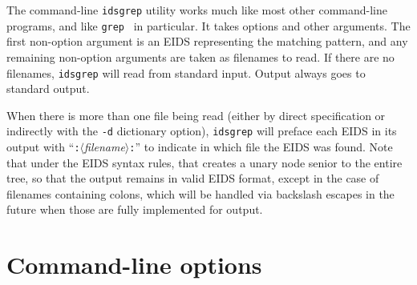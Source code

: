\documentclass[twocolumn]{report}
\begin{document}
The command-line \texttt{idsgrep} utility works much like most other
command-line programs, and like \texttt{grep}~\cite{grep} in particular.  It
takes options and other arguments.  The first non-option argument is an EIDS
representing the matching pattern, and any remaining non-option arguments
are taken as filenames to read.  If there are no filenames, \texttt{idsgrep}
will read from standard input.  Output always goes to standard output.

When there is more than one file being read (either by direct specification
or indirectly with the \texttt{-d} dictionary option), \texttt{idsgrep} will
preface each EIDS in its output with
``\texttt{:}$\langle$\textit{filename}$\rangle$\texttt{:}'' to indicate
in which file the EIDS was found.  Note that under the EIDS syntax rules,
that creates a unary node senior to the entire tree, so that the output
remains in valid EIDS format, except in the case of filenames containing
colons, which will be handled via backslash escapes in the future when those
are fully implemented for output.


\section{Command-line options}
\end{document}
